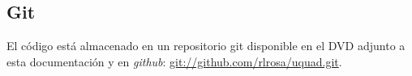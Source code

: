 \documentclass[main]{subfiles}
\begin{document}







\subsection{Git}
\label{sec:codigo:git}

El código está almacenado en un repositorio git disponible en el DVD adjunto a esta documentación y en \textit{github}: \url{git://github.com/rlrosa/uquad.git}.
\end{document}
